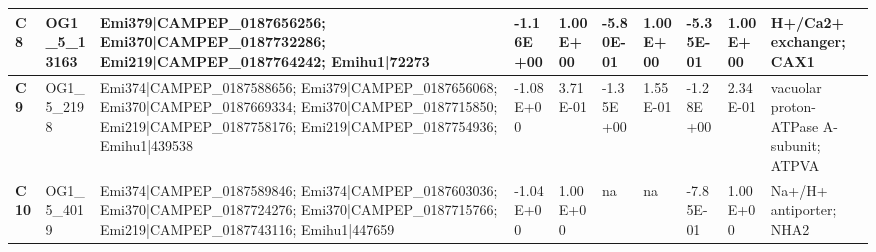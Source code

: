 \begin{landscape}
\begin{center}
\begin{footnotesize}
\begin{longtable}{|p{0.5cm}|p{1.5cm}|p{4cm}|l|l|l|l|l|l|l|}
\textbf{C8}  & OG1\_5\_13163 & Emi379|CAMPEP\_0187656256; Emi370|CAMPEP\_0187732286; Emi219|CAMPEP\_0187764242; Emihu1|72273                                                                                                                                                                                                                                                                                                                                                                                                                                                                                                                                            & -1.16E+00 & 1.00E+00 & -5.80E-01 & 1.00E+00 & -5.35E-01 & 1.00E+00 & H+/Ca2+ exchanger; CAX1                                                      \\ \hline
\textbf{C9}  & OG1\_5\_2198  & Emi374|CAMPEP\_0187588656; Emi379|CAMPEP\_0187656068; Emi370|CAMPEP\_0187669334; Emi370|CAMPEP\_0187715850; Emi219|CAMPEP\_0187758176; Emi219|CAMPEP\_0187754936; Emihu1|439538                                                                                                                                                                                                                                                                                                                                                                                                                                                          & -1.08E+00 & 3.71E-01 & -1.35E+00 & 1.55E-01 & -1.28E+00 & 2.34E-01 & vacuolar proton-ATPase A-subunit; ATPVA                                      \\ \hline
\textbf{C10} & OG1\_5\_4019  & Emi374|CAMPEP\_0187589846; Emi374|CAMPEP\_0187603036; Emi370|CAMPEP\_0187724276; Emi370|CAMPEP\_0187715766; Emi219|CAMPEP\_0187743116; Emihu1|447659                                                                                                                                                                                                                                                                                                                                                                                                                                                                                     & -1.04E+00 & 1.00E+00 & na        & na       & -7.85E-01 & 1.00E+00 & Na+/H+ antiporter; NHA2                                                      \\ \hline

\end{longtable}
\end{footnotesize}
\end{center}
\end{landscape}
